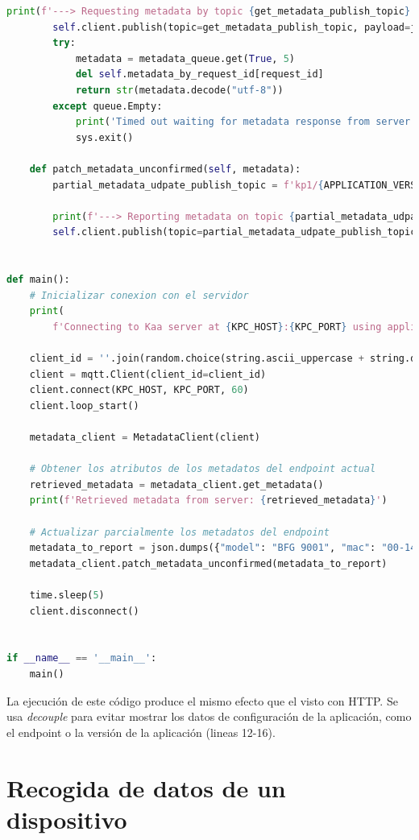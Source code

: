 {\begin{lstlisting}[language=Python]
        print(f'---> Requesting metadata by topic {get_metadata_publish_topic}')
        self.client.publish(topic=get_metadata_publish_topic, payload=json.dumps({}))
        try:
            metadata = metadata_queue.get(True, 5)
            del self.metadata_by_request_id[request_id]
            return str(metadata.decode("utf-8"))
        except queue.Empty:
            print('Timed out waiting for metadata response from server')
            sys.exit()

    def patch_metadata_unconfirmed(self, metadata):
        partial_metadata_udpate_publish_topic = f'kp1/{APPLICATION_VERSION}/epmx/{ENDPOINT_TOKEN}/update/keys'

        print(f'---> Reporting metadata on topic {partial_metadata_udpate_publish_topic}\nwith payload {metadata}')
        self.client.publish(topic=partial_metadata_udpate_publish_topic, payload=metadata)


def main():
    # Inicializar conexion con el servidor
    print(
        f'Connecting to Kaa server at {KPC_HOST}:{KPC_PORT} using application version {APPLICATION_VERSION} and endpoint token {ENDPOINT_TOKEN}')

    client_id = ''.join(random.choice(string.ascii_uppercase + string.digits) for _ in range(6))
    client = mqtt.Client(client_id=client_id)
    client.connect(KPC_HOST, KPC_PORT, 60)
    client.loop_start()

    metadata_client = MetadataClient(client)

    # Obtener los atributos de los metadatos del endpoint actual
    retrieved_metadata = metadata_client.get_metadata()
    print(f'Retrieved metadata from server: {retrieved_metadata}')

    # Actualizar parcialmente los metadatos del endpoint
    metadata_to_report = json.dumps({"model": "BFG 9001", "mac": "00-14-22-02-23-45"})
    metadata_client.patch_metadata_unconfirmed(metadata_to_report)

    time.sleep(5)
    client.disconnect()


if __name__ == '__main__':
    main()

\end{lstlisting}

La ejecución de este código produce el mismo efecto que el visto con HTTP. Se usa \textit{decouple} para evitar mostrar los datos de configuración de la aplicación, como el endpoint o la versión de la aplicación (lineas 12-16).
}

\section{Recogida de datos de un dispositivo}

